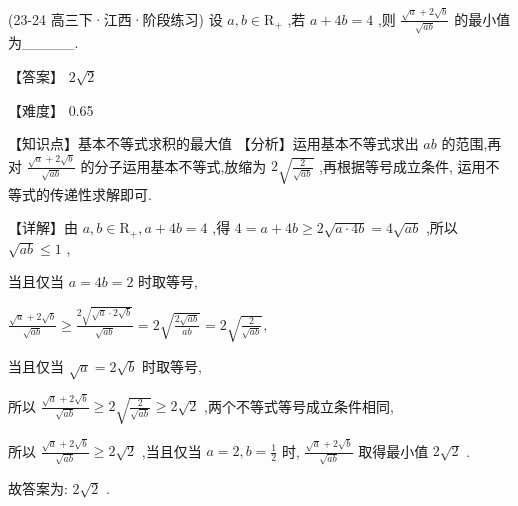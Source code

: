 \documentclass[11pt,a4paper]{article}
\begin{document}
\begin{hmwk} 
 (23-24 高三下·江西·阶段练习) 设 \(\displaystyle a,b \in  {\mathrm{R}}_{ + }\) ,若 \(\displaystyle a + {4b} = 4\) ,则 \(\displaystyle \frac{\sqrt{a} + 2\sqrt{b}}{\sqrt{ab}}\) 的最小值为\_\_\_\_\_.

\begin{jiexi}
【答案】 \(\displaystyle 2\sqrt{2}\)

【难度】 0.65

【知识点】基本不等式求积的最大值 【分析】运用基本不等式求出 \(\displaystyle {ab}\) 的范围,再对 \(\displaystyle \frac{\sqrt{a} + 2\sqrt{b}}{\sqrt{ab}}\) 的分子运用基本不等式,放缩为 \(\displaystyle 2\sqrt{\frac{2}{\sqrt{ab}}}\) ,再根据等号成立条件, 运用不等式的传递性求解即可.

【详解】由 \(\displaystyle a,b \in  {\mathrm{R}}_{ + },a + {4b} = 4\) ,得 \(\displaystyle 4 = a + {4b} \geq  2\sqrt{a \cdot  {4b}} = 4\sqrt{ab}\) ,所以 \(\displaystyle \sqrt{ab} \leq  1\) ,

当且仅当 \(\displaystyle a = {4b} = 2\) 时取等号,

\(\displaystyle \frac{\sqrt{a} + 2\sqrt{b}}{\sqrt{ab}} \geq  \frac{2\sqrt{\sqrt{a} \cdot  2\sqrt{b}}}{\sqrt{ab}} = 2\sqrt{\frac{2\sqrt{ab}}{ab}} = 2\sqrt{\frac{2}{\sqrt{ab}}},\)

当且仅当 \(\displaystyle \sqrt{a} = 2\sqrt{b}\) 时取等号,

所以 \(\displaystyle \frac{\sqrt{a} + 2\sqrt{b}}{\sqrt{ab}} \geq  2\sqrt{\frac{2}{\sqrt{ab}}} \geq  2\sqrt{2}\) ,两个不等式等号成立条件相同,

所以 \(\displaystyle \frac{\sqrt{a} + 2\sqrt{b}}{\sqrt{ab}} \geq  2\sqrt{2}\) ,当且仅当 \(\displaystyle a = 2,b = \frac{1}{2}\) 时, \(\displaystyle \frac{\sqrt{a} + 2\sqrt{b}}{\sqrt{ab}}\) 取得最小值 \(\displaystyle 2\sqrt{2}\) .

故答案为: \(\displaystyle 2\sqrt{2}\) .

\end{jiexi}
\end{hmwk}
\end{document}
